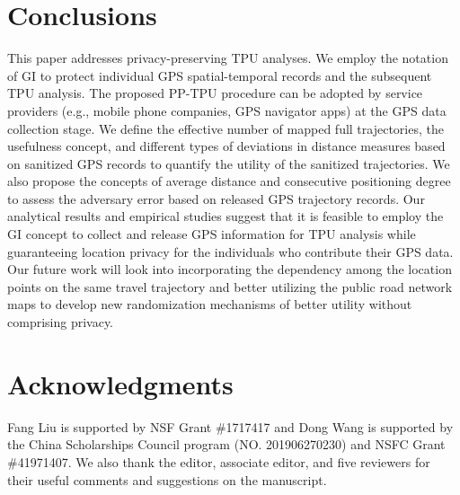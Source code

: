 \documentclass[10pt,journal,compsoc]{IEEEtran}
\begin{document}
\vspace{-9pt}\section{Conclusions}\vspace{-6pt}
This paper addresses privacy-preserving TPU analyses. We employ the notation of GI to protect individual GPS spatial-temporal records and the subsequent TPU analysis. The proposed PP-TPU procedure can be adopted by service providers (e.g., mobile phone companies, GPS navigator apps) at the GPS data collection stage. We define the effective number of mapped full trajectories, the  usefulness concept, and different types of deviations in distance measures based on sanitized GPS records to quantify the utility of the sanitized trajectories. We also propose the concepts of average distance and consecutive positioning degree to assess the adversary error based on released GPS trajectory records.  Our analytical results and empirical studies suggest that it is feasible to employ the GI concept to collect and release GPS information for TPU analysis while guaranteeing location privacy for the individuals who contribute their GPS data.  Our future work will look into incorporating the dependency among the location points on the same travel trajectory and better utilizing the public road network maps to develop new randomization mechanisms of better utility without comprising privacy.

\vspace{-12pt}
\section*{Acknowledgments}\vspace{-3pt}
Fang Liu is supported by NSF Grant \#1717417 and Dong Wang is supported by the  China Scholarships Council program (NO. 201906270230) and NSFC Grant \#41971407. We also thank the editor, associate editor, and five reviewers for their useful comments and suggestions on the manuscript.

\vspace{-12pt}

%

\end{document}
